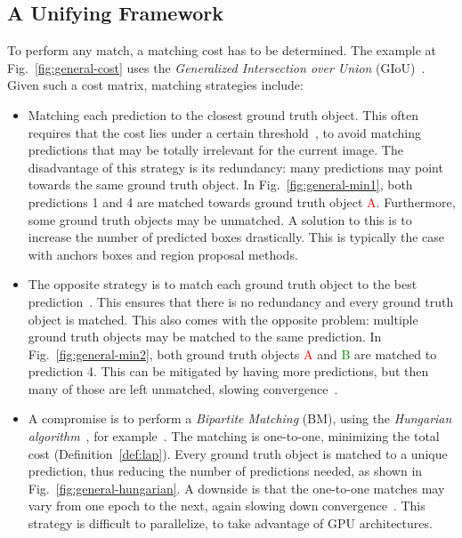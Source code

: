 \subsection{A Unifying Framework}
To perform any match, a matching cost has to be determined. The example at Fig.~\ref{fig:general-cost} uses the \emph{Generalized Intersection over Union} ($\mathrm{GIoU}$)~\cite{giou}. Given such a cost matrix, matching strategies include:

\begin{itemize}
    \item Matching each prediction to the closest ground truth object. This often requires that the cost lies under a certain threshold~\cite{liu2016ssd,ren2015fasterrcnn,redmon2016yolo,lin2017focalloss}, to avoid matching predictions that may be totally irrelevant for the current image. The disadvantage of this strategy is its redundancy: many predictions may point towards the same ground truth object. In Fig.~\ref{fig:general-min1}, both predictions 1 and 4 are matched towards ground truth object \textcolor{red}{A}. Furthermore, some ground truth objects may be unmatched. A solution to this is to increase the number of predicted boxes drastically. This is typically the case with anchors boxes and region proposal methods.
    
    \item The opposite strategy is to match each ground truth object to the best prediction~\cite{he2015spatial,liu2016ssd}. This ensures that there is no redundancy and every ground truth object is matched. This also comes with the opposite problem: multiple ground truth objects may be matched to the same prediction. In Fig.~\ref{fig:general-min2}, both ground truth objects \textcolor{red}{A} and \textcolor{green}{B} are matched to prediction 4. This can be mitigated by having more predictions, but then many of those are left unmatched, slowing convergence~\cite{liu2016ssd}.
    
    \item A compromise is to perform a \emph{Bipartite Matching} (BM), using the \emph{Hungarian algorithm}~\cite{kuhn1955hungarian,munkres1957algorithmstransportationhungarian}, for example~\cite{carion2020detr,zhu2020deformabledetr}. The matching is one-to-one, minimizing the total cost (Definition~\ref{def:lap}). Every ground truth object is matched to a unique prediction, thus reducing the number of predictions needed, as shown in Fig.~\ref{fig:general-hungarian}. A downside is that the one-to-one matches may vary from one epoch to the next, again slowing down convergence~\cite{li2022dndetr}. This strategy is difficult to parallelize, \ie to take advantage of GPU architectures.
\end{itemize}

